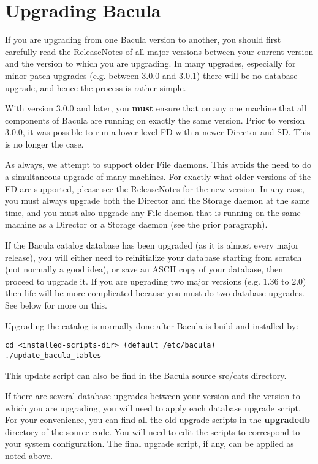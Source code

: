 \label{upgrading1}
\section{Upgrading Bacula}

If you are upgrading from one Bacula version to another, you should first
carefully read the ReleaseNotes of all major versions between your current
version and the version to which you are upgrading.  In many upgrades,
especially for minor patch upgrades (e.g. between 3.0.0 and 3.0.1) there
will be no database upgrade, and hence the process is rather simple.

With version 3.0.0 and later, you {\bf must} ensure that on any one
machine that all components of Bacula are running on exactly the
same version.  Prior to version 3.0.0, it was possible to run a 
lower level FD with a newer Director and SD.  This is no longer the
case.  

As always, we attempt to support older File daemons. This avoids the
need to do a simultaneous upgrade of many machines. For exactly what
older versions of the FD are supported, please see the ReleaseNotes 
for the new version.  In any case, you must always upgrade both the
Director and the Storage daemon at the same time, and you must also
upgrade any File daemon that is running on the same machine as a Director
or a Storage daemon (see the prior paragraph).

If the Bacula catalog
database has been upgraded (as it is almost every major release), you will
either need to reinitialize your database starting from scratch (not
normally a good idea), or save an ASCII copy of your database, then proceed
to upgrade it. If you are upgrading two major versions (e.g. 1.36 to 2.0)
then life will be more complicated because you must do two database
upgrades. See below for more on this.

Upgrading the catalog is normally done after Bacula is build and installed
by:

\begin{verbatim}
cd <installed-scripts-dir> (default /etc/bacula)
./update_bacula_tables
\end{verbatim}

This update script can also be find in the Bacula source src/cats
directory.

If there are several database upgrades between your version and the
version to which you are upgrading, you will need to apply each database
upgrade script. For your convenience, you can find all the old upgrade scripts
in the {\bf upgradedb} directory of the source code. You will need to edit the
scripts to correspond to your system configuration. The final upgrade script,
if any, can be applied as noted above.

